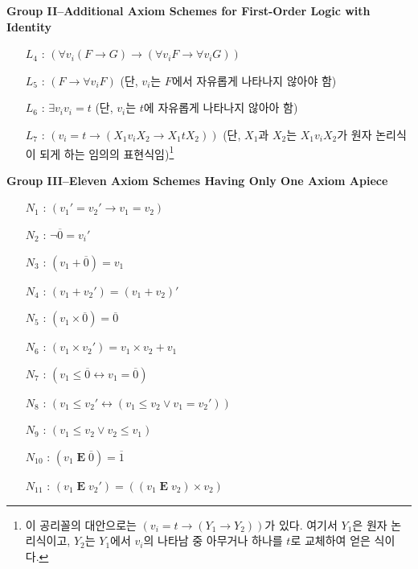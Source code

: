 \documentclass[12pt]{paper}
\begin{document}
  \noindent \textbf{Group II--Additional Axiom Schemes for First-Order Logic with Identity}
  \begin{enumerate}
    \item[$L_{4}$ :] $\left( \forall v_i \left( F \rightarrow G \right) \rightarrow \left( \forall v_i F \rightarrow \forall v_i G \right) \right)$
    \item[$L_{5}$ :] $\left( F \rightarrow \forall v_i F \right)$ (단, $v_i$는 $F$에서 자유롭게 나타나지 않아야 함)
    \item[$L_{6}$ :] $\exists v_i v_i = t$ (단, $v_i$는 $t$에 자유롭게 나타나지 않아아 함)
    \item[$L_{7}$ :] $\left( v_i = t \rightarrow \left( X_1 v_i X_2 \rightarrow X_1 t X_2 \right) \right)$ (단, $X_1$과 $X_2$는 $X_1 v_i X_2$가 원자 논리식이 되게 하는 임의의 표현식임)\footnote
    {
      이 공리꼴의 대안으로는 $\left( v_i = t \rightarrow \left( Y_1 \rightarrow Y_2 \right) \right)$가 있다.
      여기서 $Y_1$은 원자 논리식이고, $Y_2$는 $Y_1$에서 $v_i$의 나타남 중 아무거나 하나를 $t$로 교체하여 얻은 식이다.
    }
  \end{enumerate}

  \noindent \textbf{Group III--Eleven Axiom Schemes Having Only One Axiom Apiece}
  \begin{enumerate}
    \item[$N_{1}$ :] $\left( v_1 ' = v_2 ' \rightarrow v_1 = v_2 \right)$
    \item[$N_{2}$ :] $\lnot \overline{0} = v_i '$
    \item[$N_{3}$ :] $\left( v_1 + \overline{0} \right) = v_1$
    \item[$N_{4}$ :] $\left( v_1 + v_2 ' \right) = \left( v_1 + v_2 \right) '$
    \item[$N_{5}$ :] $\left( v_1 \times \overline{0} \right) = \overline{0}$
    \item[$N_{6}$ :] $\left( v_1 \times v_2 ' \right) = v_1 \times v_2 + v_1$
    \item[$N_{7}$ :] $\left( v_1 \leq \overline{0} \leftrightarrow v_1 = \overline{0} \right)$
    \item[$N_{8}$ :] $\left( v_1 \leq v_2 ' \leftrightarrow \left( v_1 \leq v_2 \lor v_1 = v_2 ' \right) \right)$
    \item[$N_{9}$ :] $\left( v_1 \leq v_2 \lor v_2 \leq v_1 \right)$
    \item[$N_{10}$ :] $\left( v_1 \mathop{\mathbf{E}} \overline{0} \right) = \overline{1}$
    \item[$N_{11}$ :] $\left( v_1 \mathop{\mathbf{E}} v_2 ' \right) = \left( \left( v_1 \mathop{\mathbf{E}} v_2 \right) \times v_2 \right)$ 
  \end{enumerate}
\end{document}
